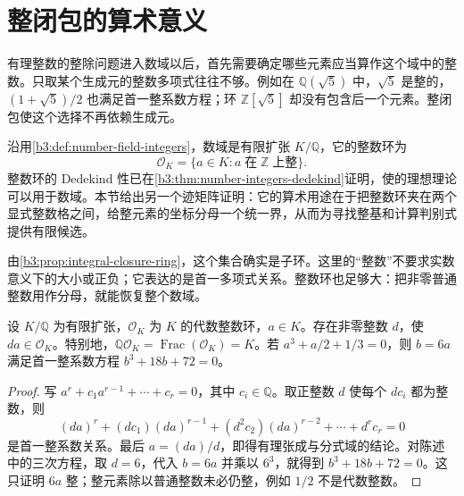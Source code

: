 
\section{整闭包的算术意义}
\label{b3:sec:A01}

%
%
%


有理整数的整除问题进入数域以后，首先需要确定哪些元素应当算作这个域中的整数。只取某个生成元的整数多项式往往不够。例如在 \(\mathbb Q(\sqrt5)\) 中，\(\sqrt5\) 是整的，\((1+\sqrt5)/2\) 也满足首一整系数方程；环 \(\mathbb Z[\sqrt5]\) 却没有包含后一个元素。整闭包使这个选择不再依赖生成元。

\ProseParagraphBreak
沿用\cref{b3:def:number-field-integers}，数域是有限扩张 \(K/\mathbb Q\)，它的整数环为
\[
	\mathcal O_K=\{a\in K:a\;\text{在}\;\mathbb Z\;\text{上整}\}.
\]
整数环的 Dedekind 性已在\cref{b3:thm:number-integers-dedekind}证明，使的理想理论可以用于数域。本节给出另一个迹矩阵证明：它的算术用途在于把整数环夹在两个显式整数格之间，给整元素的坐标分母一个统一界，从而为寻找整基和计算判别式提供有限候选。

\ProseParagraphBreak
由\cref{b3:prop:integral-closure-ring}，这个集合确实是子环。这里的“整数”不要求实数意义下的大小或正负；它表达的是首一多项式关系。整数环也足够大：把非零普通整数用作分母，就能恢复整个数域。

\begin{lemma}\label{b3:lem:number-field-clear-denominators}
	设 \(K/\mathbb Q\) 为有限扩张，\(\mathcal O_K\) 为 \(K\) 的代数整数环，\(a\in K\)。存在非零整数 \(d\)，使 \(da\in\mathcal O_K\)。特别地，\(\mathbb Q\mathcal O_K=\operatorname{Frac}(\mathcal O_K)=K\)。若 \(a^3+a/2+1/3=0\)，则 \(b=6a\) 满足首一整系数方程 \(b^3+18b+72=0\)。
\end{lemma}
\begin{proof}
	写 \(a^r+c_1a^{r-1}+\cdots+c_r=0\)，其中 \(c_i\in\mathbb Q\)。取正整数 \(d\) 使每个 \(dc_i\) 都为整数，则
	\[
		(da)^r+(dc_1)(da)^{r-1}+(d^2c_2)(da)^{r-2}+\cdots+d^rc_r=0
	\]
	是首一整系数关系。最后 \(a=(da)/d\)，即得有理张成与分式域的结论。对陈述中的三次方程，取 \(d=6\)，代入 \(b=6a\) 并乘以 \(6^3\)，就得到 \(b^3+18b+72=0\)。这只证明 \(6a\) 整；整元素除以普通整数未必仍整，例如 \(1/2\) 不是代数整数。
\end{proof}

